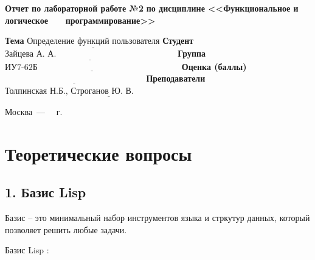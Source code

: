 \documentclass[12pt]{report}
\begin{document}
\begin{titlepage}
		\begin{center}
			\noindent\begin{minipage}{1.1\textwidth}\centering
				\Large\textbf{  Отчет по лабораторной работе №2}\newline
				\textbf{по дисциплине <<Функциональное и логическое}\newline
				\textbf{~~~программирование>>}\newline\newline
			\end{minipage}
		\end{center}
		
		\noindent\textbf{Тема} $\underline{\text{Определение функций пользователя}}$\newline\newline
		\noindent\textbf{Студент} $\underline{\text{Зайцева А. А.~~~~~~~~~~~~~~~~~~~~~~~~~~~~~~~~~~~~~~~~~~}}$\newline\newline
		\noindent\textbf{Группа} $\underline{\text{ИУ7-62Б~~~~~~~~~~~~~~~~~~~~~~~~~~~~~~~~~~~~~~~~~~~~~~~~~~}}$\newline\newline
		\noindent\textbf{Оценка (баллы)} $\underline{\text{~~~~~~~~~~~~~~~~~~~~~~~~~~~~~~~~~~~~~~~~~~~~~~~~~}}$\newline\newline
		\noindent\textbf{Преподаватели} $\underline{\text{Толпинская Н.Б., Строганов Ю. В.~~~~~~~~~~~~~~~~~~~~~~~~~~~~}}$\newline\newline\newline
		
		\begin{center}
			\vfill
			Москва~---~\the\year
			~г.
		\end{center}
	\end{titlepage}
	
\chapter*{Теоретические вопросы}

\section*{1. Базис Lisp}
	
Базис -- это минимальный набор инструментов языка и стркутур данных, который позволяет решить любые задачи.


Базис Lisp :
\end{document}

